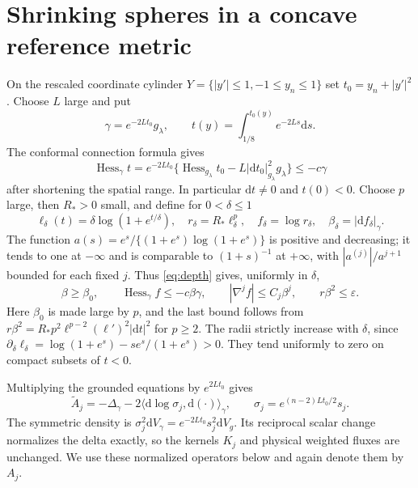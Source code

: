 \documentclass[11pt]{article}
\theoremstyle{definition}\newtheorem{definition}[theorem]{Definition}
\theoremstyle{remark}\newtheorem{remark}[theorem]{Remark}
\newcommand{\dd}{\mathrm d}
\newcommand{\vol}{\dd V}
\newcommand{\Hess}{\operatorname{Hess}}
\newcommand{\ip}[2]{\langle #1,#2\rangle}
\begin{document}
\section{Shrinking spheres in a concave reference metric}\label{sec:spheres}

On the rescaled coordinate cylinder $Y=\{|y'|\le1,-1\le y_n\le1\}$ set
$t_0=y_n+|y'|^2$. Choose $L$ large and put
\[
 \gamma=e^{-2Lt_0}g_\lambda,\qquad
 t(y)=\int_{1/8}^{t_0(y)}e^{-2Ls}\dd s.
\]
The conformal connection formula gives
\begin{equation}\label{eq:depth}
 \Hess_\gamma t=e^{-2Lt_0}
   \{\Hess_{g_\lambda}t_0-L|\dd t_0|_{g_\lambda}^2g_\lambda\}
 \le-c\gamma
\end{equation}
after shortening the spatial range. In particular $\dd t\ne0$ and $t(0)<0$.
Choose $p$ large, then $R_*>0$ small, and define for $0<\delta\le1$
\begin{equation}\label{eq:radii}
 \ell_\delta(t)=\delta\log(1+e^{t/\delta}),\quad
 r_\delta=R_*\ell_\delta^p,\quad f_\delta=\log r_\delta,\quad
 \beta_\delta=|\dd f_\delta|_\gamma.
\end{equation}
The function $a(s)=e^s/\{(1+e^s)\log(1+e^s)\}$ is positive and decreasing;
it tends to one at $-\infty$ and is comparable to $(1+s)^{-1}$ at
$+\infty$, with $|a^{(j)}|/a^{j+1}$ bounded for each fixed $j$.
Thus \eqref{eq:depth} gives, uniformly in $\delta$,
\begin{equation}\label{eq:profile}
 \beta\ge\beta_0,\qquad\Hess_\gamma f\le-c\beta\gamma,\qquad
 |\nabla^jf|\le C_j\beta^j,\qquad r\beta^2\le\varepsilon.
\end{equation}
Here $\beta_0$ is made large by $p$, and the last bound follows from
$r\beta^2=R_*p^2\ell^{p-2}(\ell')^2|\dd t|^2$ for $p\ge2$.
The radii strictly increase with $\delta$, since
$\partial_\delta\ell_\delta=\log(1+e^s)-se^s/(1+e^s)>0$.
They tend uniformly to zero on compact subsets of $t<0$.

Multiplying the grounded equations by $e^{2Lt_0}$ gives
\begin{equation}\label{eq:conformal}
 \widetilde A_j=-\Delta_\gamma-2\ip{\dd\log\sigma_j}{\dd(\cdot)}_\gamma,
 \qquad\sigma_j=e^{(n-2)Lt_0/2}s_j.
\end{equation}
The symmetric density is $\sigma_j^2\vol_\gamma=e^{-2Lt_0}s_j^2\vol_g$.
Its reciprocal scalar change normalizes the delta exactly, so the kernels
$K_j$ and physical weighted fluxes are unchanged. We use these normalized
operators below and again denote them by $A_j$.
\end{document}
